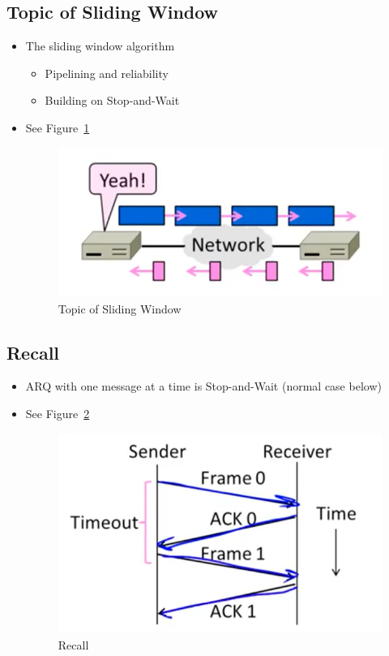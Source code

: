 \documentclass[12pt]{ctexart}   %
\begin{document}
	\subsection{Topic of Sliding Window}
	\begin{itemize}
		\item The sliding window algorithm
		\begin{itemize}
			\item Pipelining and reliability
			\item Building on Stop-and-Wait
		\end{itemize}
		 \item See Figure~\ref{fig:6-5-1}
		  
		 \begin{figure}[h!] %
		\centering
		 \includegraphics[scale=0.7]{images/6-5-1}
		\caption{  Topic of Sliding Window }
		 \label{fig:6-5-1}
		 \end{figure}
	\end{itemize}
	
	\subsection{Recall}
	\begin{itemize}
		\item ARQ with one message at a time is Stop-and-Wait (normal case below)
		\item See Figure~\ref{fig:6-5-2}
		  
		 \begin{figure}[h!] %
		\centering
		 \includegraphics[scale=0.7]{images/6-5-2}
		\caption{  Recall }
		 \label{fig:6-5-2}
		 \end{figure}
	\end{itemize}
	
\end{document}
